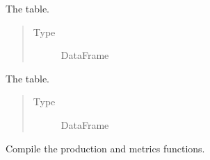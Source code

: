 \documentclass[letterpaper,10pt,english]{sphinxmanual}
\begin{document}
\begin{fulllineitems}
\begin{fulllineitems}
\begin{quote}
\begin{description}
\end{description}\end{quote}

\end{fulllineitems}


\begin{fulllineitems}
\label{\detokenize{tyche:tyche.Designs.Designs.parameters}}
The  table.
\begin{quote}\begin{description}
\item[{Type}] \leavevmode
DataFrame

\end{description}\end{quote}

\end{fulllineitems}


\begin{fulllineitems}
\label{\detokenize{tyche:tyche.Designs.Designs.results}}
The  table.
\begin{quote}\begin{description}
\item[{Type}] \leavevmode
DataFrame

\end{description}\end{quote}

\end{fulllineitems}


\begin{fulllineitems}
\label{\detokenize{tyche:tyche.Designs.Designs.compile}}
Compile the production and metrics functions.

\end{fulllineitems}



\end{fulllineitems}
\end{document}
